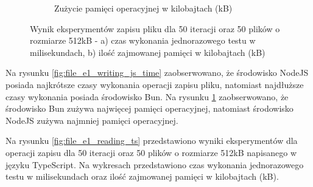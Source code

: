 \begin{figure}[H]
\begin{subfigure}[b]{0.42\textwidth}
    \caption{Zużycie pamięci operacyjnej w kilobajtach (kB)}
    \label{fig:file_e1_writing_js_memory}
  \end{subfigure}
  \caption{Wynik eksperymentów zapisu pliku dla 50 iteracji oraz 50 plików o rozmiarze 512kB - a) czas wykonania jednorazowego testu w milisekundach, b) ilość zajmowanej pamięci w kilobajtach (kB)}
  \label{fig:file_e1_writing_js}
\end{figure}

Na rysunku \ref{fig:file_e1_writing_js_time} zaobserwowano, że środowisko NodeJS posiada najkrótsze czasy wykonania operacji zapisu pliku, natomiast najdłuższe czasy wykonania posiada środowisko Bun. Na rysunku \ref{fig:file_e1_writing_js_memory} zaobserwowano, że środowisko Bun zużywa najwięcej pamięci operacyjnej, natomiast środowisko NodeJS zużywa najmniej pamięci operacyjnej.

Na rysunku \ref{fig:file_e1_reading_ts} przedstawiono wyniki eksperymentów dla operacji zapisu dla 50 iteracji oraz 50 plików o rozmiarze 512kB napisanego w języku TypeScript. Na wykresach przedstawiono czas wykonania jednorazowego testu w milisekundach oraz ilość zajmowanej pamięci w kilobajtach (kB).

